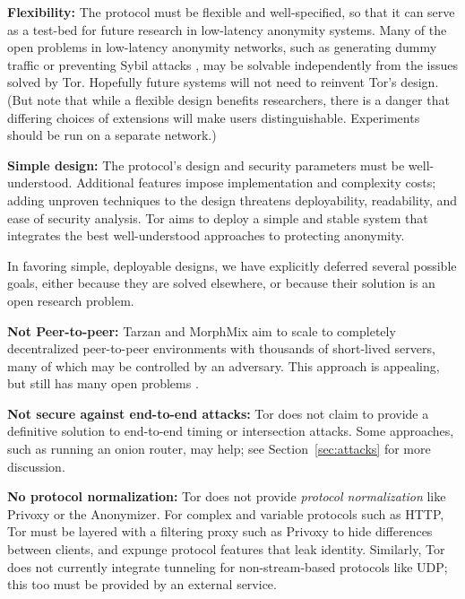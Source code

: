\documentclass[times,10pt,twocolumn]{article}
\begin{document}
\textbf{Flexibility:} The protocol must be flexible and well-specified,
so that it can serve as a test-bed for future research in low-latency
anonymity systems.  Many of the open problems in low-latency anonymity
networks, such as generating dummy traffic or preventing Sybil attacks
\cite{sybil}, may be solvable independently from the issues solved by
Tor. Hopefully future systems will not need to reinvent Tor's design.
(But note that while a flexible design benefits researchers,
there is a danger that differing choices of extensions will make users
distinguishable. Experiments should be run on a separate network.)

\textbf{Simple design:} The protocol's design and security
parameters must be well-understood. Additional features impose implementation
and complexity costs; adding unproven techniques to the design threatens
deployability, readability, and ease of security analysis. Tor aims to
deploy a simple and stable system that integrates the best well-understood
approaches to protecting anonymity.

\label{subsec:non-goals}
In favoring simple, deployable designs, we have explicitly deferred
several possible goals, either because they are solved elsewhere, or because
their solution is an open research problem.

\textbf{Not Peer-to-peer:} Tarzan and MorphMix aim to scale to completely
decentralized peer-to-peer environments with thousands of short-lived
servers, many of which may be controlled by an adversary.  This approach
is appealing, but still has many open problems
\cite{tarzan:ccs02,morphmix:fc04}.

\textbf{Not secure against end-to-end attacks:} Tor does not claim
to provide a definitive solution to end-to-end timing or intersection
attacks. Some approaches, such as running an onion router, may help;
see Section~\ref{sec:attacks} for more discussion.

\textbf{No protocol normalization:} Tor does not provide \emph{protocol
normalization} like Privoxy or the Anonymizer. For complex and variable
protocols such as HTTP, Tor must be layered with a filtering proxy such
as Privoxy to hide differences between clients, and expunge protocol
features that leak identity. Similarly, Tor does not currently integrate
tunneling for non-stream-based protocols like UDP; this too must be
provided by an external service.
\end{document}

